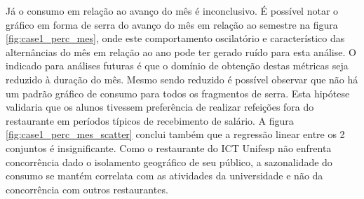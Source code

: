 {\begin{center}
                    \begin{minipage}[c]{0.5\textwidth}
                    \begin{figure}[H]
                    \end{figure}
                    \end{minipage}
                \end{center}
                }
                Já o consumo em relação ao avanço do mês é inconclusivo. É possível notar o gráfico em forma de serra do avanço do mês em relação ao semestre na figura \ref{fig:case1_perc_mes}, onde este comportamento oscilatório e característico das alternâncias do mês em relação ao ano pode ter gerado ruído para esta análise. O indicado para análises futuras é que o domínio de obtenção destas métricas seja reduzido à duração do mês. Mesmo sendo reduzido é possível observar que não há um padrão gráfico de consumo para todos os fragmentos de serra. Esta hipótese validaria que os alunos tivessem preferência de realizar refeições fora do restaurante em períodos típicos de recebimento de salário. A figura \ref{fig:case1_perc_mes_scatter} conclui também que a regressão linear entre os 2 conjuntos é insignificante. Como o restaurante do ICT Unifesp não enfrenta concorrência dado o isolamento geográfico de seu público, a sazonalidade do consumo se mantém correlata com as atividades da universidade e não da concorrência com outros restaurantes.
                
